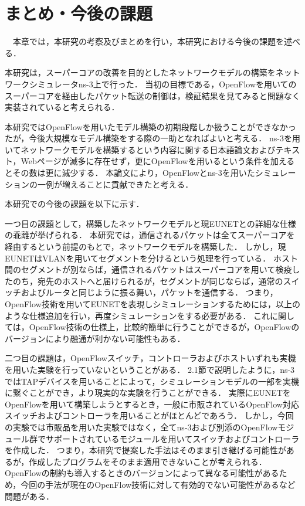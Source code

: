 \chapter{まとめ・今後の課題}

　本章では，本研究の考察及びまとめを行い，本研究における今後の課題を述べる．

本研究は，スーパーコアの改善を目的としたネットワークモデルの構築をネットワークシミュレータns-3上で行った．
当初の目標である，OpenFlowを用いてのスーパーコアを経由したパケット転送の制御は，検証結果を見てみると問題なく実装されていると考えられる．

本研究ではOpenFlowを用いたモデル構築の初期段階しか扱うことができなかったが，今後大規模なモデル構築をする際の一助となればよいと考える．
ns-3を用いてネットワークモデルを構築するという内容に関する日本語論文およびテキスト，Webページが滅多に存在せず，更にOpenFlowを用いるという条件を加えるとその数は更に減少する．
本論文により，OpenFlowとns-3を用いたシミュレーションの一例が増えることに貢献できたと考える．

本研究での今後の課題を以下に示す．

一つ目の課題として，構築したネットワークモデルと現EUNETとの詳細な仕様の乖離が挙げられる．
本研究では，通信されるパケットは全てスーパーコアを経由するという前提のもとで，ネットワークモデルを構築した．
しかし，現EUNETはVLANを用いてセグメントを分けるという処理を行っている．
ホスト間のセグメントが別ならば，通信されるパケットはスーパーコアを用いて検疫したのち，宛先のホストへと届けられるが，セグメントが同じならば，通常のスイッチおよびルータと同じように振る舞い，パケットを通信する．
つまり，OpenFlow技術を用いてEUNETを表現しシミュレーションするためには，以上のような仕様追加を行い，再度シミュレーションをする必要がある．
これに関しては，OpenFlow技術の仕様上，比較的簡単に行うことができるが，OpenFlowのバージョンにより融通が利かない可能性もある．

二つ目の課題は，OpenFlowスイッチ，コントローラおよびホストいずれも実機を用いた実験を行っていないということがある．
2.1節で説明したように，ns-3ではTAPデバイスを用いることによって，シミュレーションモデルの一部を実機に繋ぐことができ，より現実的な実験を行うことができる．
実際にEUNETをOpenFlowを用いて構築しようとするとき，一般に市販されているOpenFlow対応スイッチおよびコントローラを用いることがほとんどであろう．
しかし，今回の実験では市販品を用いた実験ではなく，全てns-3および別添のOpenFlowモジュール群でサポートされているモジュールを用いてスイッチおよびコントローラを作成した．
つまり，本研究で提案した手法はそのまま引き継げる可能性があるが，作成したプログラムをそのまま適用できないことが考えられる．
OpenFlowの制約も導入するときのバージョンによって異なる可能性があるため，今回の手法が現在のOpenFlow技術に対して有効的でない可能性があるなど問題がある．